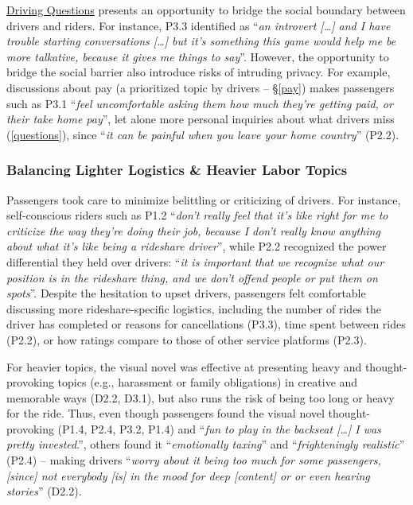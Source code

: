 \ul{Driving Questions} presents an opportunity to bridge the social boundary between drivers and riders. For instance, P3.3 identified as ``\textit{an introvert [\dots] and I have trouble starting conversations [\dots] but it's something this game would help me be more talkative, because it gives me things to say}''. However, the opportunity to bridge the social barrier also introduce risks of intruding privacy. For example, discussions about pay (a prioritized topic by drivers -- \S\ref{pay}) makes passengers such as P3.1 ``\textit{feel uncomfortable asking them how much they're getting paid, or their take home pay}'', let alone more personal inquiries about what drivers miss (\ref{questions}), since ``\textit{it can be painful when you leave your home country}'' (P2.2).

\subsubsection{Balancing Lighter Logistics \& Heavier Labor Topics}
Passengers took care to minimize belittling or criticizing of drivers. For instance, self-conscious riders such as P1.2 ``\textit{don't really feel that it's like right for me to criticize the way they're doing their job, because I don't really know anything about what it's like being a rideshare driver}'', while P2.2 recognized the power differential they held over drivers: ``\textit{it is important that we recognize what our position is in the rideshare thing, and we don't offend people or put them on spots}''.
Despite the hesitation to upset drivers, passengers felt comfortable discussing more rideshare-specific logistics, including the number of rides the driver has completed or reasons for cancellations (P3.3), time spent between rides (P2.2), or how ratings compare to those of other service platforms (P2.3).

For heavier topics, the visual novel was effective at presenting heavy and thought-provoking topics (e.g., harassment or family obligations) in creative and memorable ways (D2.2, D3.1), but also runs the risk of being too long or heavy for the ride. Thus, even though passengers found the visual novel thought-provoking (P1.4, P2.4, P3.2, P1.4) and ``\textit{fun to play in the backseat [\dots] I was pretty invested}.'', others found it ``\textit{emotionally taxing}'' and ``\textit{frighteningly realistic}'' (P2.4) -- making drivers
``\textit{worry about it being too much for some passengers, [since] not everybody [is] in the mood for deep [content] or or even hearing stories}'' (D2.2).


